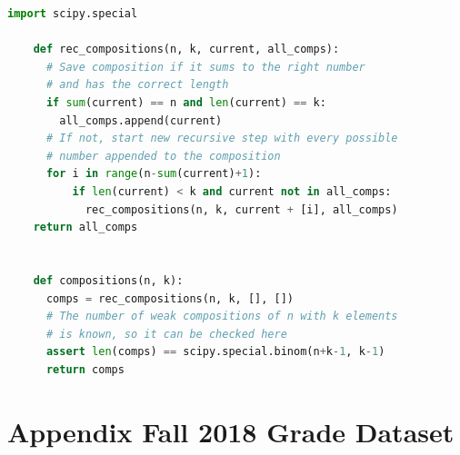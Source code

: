 \documentclass[12pt,letterpaper,oneside,openany]{book}
\renewcommand{\bibname}{\begin{center}{\bf \sc \Large Bibliography}\end{center}}
\begin{document}
\begin{minipage}{\linewidth}
	\begin{lstlisting}[language=Python, caption={Python code to compute the distance matrix of  a set of grade distributions, given as a pandas Series object.}, label={lst:pycomps}, captionpos=b]
	import scipy.special
	
	def rec_compositions(n, k, current, all_comps):
	  # Save composition if it sums to the right number
	  # and has the correct length
	  if sum(current) == n and len(current) == k:
	    all_comps.append(current)
	  # If not, start new recursive step with every possible 
	  # number appended to the composition
	  for i in range(n-sum(current)+1):
		  if len(current) < k and current not in all_comps:
		    rec_compositions(n, k, current + [i], all_comps)
    return all_comps


    def compositions(n, k):
      comps = rec_compositions(n, k, [], [])
      # The number of weak compositions of n with k elements
      # is known, so it can be checked here
      assert len(comps) == scipy.special.binom(n+k-1, k-1)
      return comps
	\end{lstlisting}
\end{minipage}


%

\singlespace





\clearpage
\appendix
\setcounter{chapter}{6}
\setcounter{table}{0}
\chapter{Appendix Fall 2018 Grade Dataset}
\label{ch:appendix}
\end{document}
